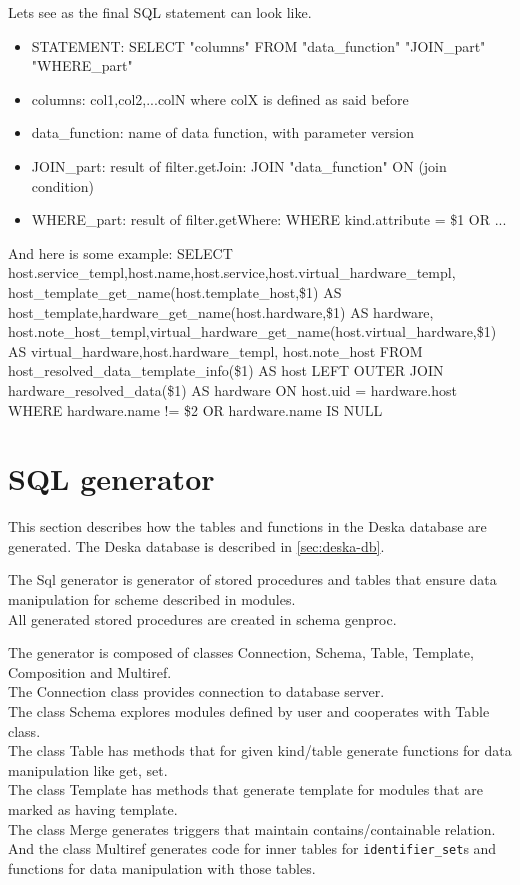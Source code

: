 \documentclass[deska]{subfiles}
\begin{document}
Lets see as the final SQL statement can look like.
\begin{itemize}
\item{STATEMENT}: SELECT "columns" FROM "data\_function" "JOIN\_part" "WHERE\_part"
\item{columns}: col1,col2,...colN where colX is defined as said before
\item{data\_function}: name of data function, with parameter version
\item{JOIN\_part}: result of filter.getJoin: JOIN "data\_function" ON (join condition)
\item{WHERE\_part}: result of filter.getWhere: WHERE kind.attribute = \$1 OR ...
\end{itemize}
And here is some example:
SELECT host.service\_templ,host.name,host.service,host.virtual\_hardware\_templ,
host\_template\_get\_name(host.template\_host,\$1) AS host\_template,hardware\_get\_name(host.hardware,\$1) AS hardware,
host.note\_host\_templ,virtual\_hardware\_get\_name(host.virtual\_hardware,\$1) AS virtual\_hardware,host.hardware\_templ,
host.note\_host FROM host\_resolved\_data\_template\_info(\$1) AS host
LEFT OUTER JOIN hardware\_resolved\_data(\$1) AS hardware ON host.uid = hardware.host
WHERE hardware.name != \$2 OR hardware.name IS NULL 

\section{SQL generator}
\label{sec:sql-generator}
This section describes how the tables and functions in the Deska database are generated. The Deska database is described in \ref{sec:deska-db}.

The Sql generator is generator of stored procedures and tables that ensure data manipulation for scheme described in modules.\\
All generated stored procedures are created in schema genproc.

The generator is composed of classes Connection, Schema, Table, Template, Composition and Multiref.\\
The Connection class provides connection to database server.\\
The class Schema explores modules defined by user and cooperates with Table class.\\
The class Table has methods that for given kind/table generate functions for data manipulation like get, set.\\
The class Template has methods that generate template for modules that are marked as having template.\\
The class Merge generates triggers that maintain contains/containable relation.\\
And the class Multiref generates code for inner tables for {\tt identifier\_set}s and functions for data manipulation with those tables.\\
\end{document}
